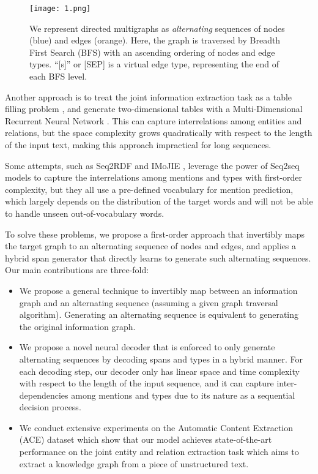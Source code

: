 \documentclass[11pt,a4paper]{article}
\begin{document}
\begin{figure}[t]
\centering
\texttt{[image: 1.png]}
\caption{We represent directed multigraphs  as \emph{alternating} sequences of nodes (blue) and edges (orange). 
Here, the graph is traversed by Breadth First Search (BFS) with an ascending ordering of nodes and edge types. ``[s]'' or [SEP] is a virtual edge type,  representing the end of each BFS level.}\label{f1}
\end{figure}


Another approach is to treat the joint information extraction task as a table filling problem \cite{zhang-etal-2017-end,tse}, and generate two-dimensional tables with a Multi-Dimensional Recurrent Neural Network \cite{graves2007multi}. This  can capture interrelations among entities and relations, but the space complexity grows quadratically with respect to the length of the input text, making this approach impractical for long sequences. 


Some attempts, such as Seq2RDF \cite{liu2018seq2rdf} and IMoJIE \cite{kolluru2020imojie},  leverage the power of Seq2seq models \cite{seq2seq} to capture the interrelations among  mentions and  types with  first-order complexity, but they all use a pre-defined vocabulary for mention prediction, which largely depends on the distribution of the target words and will not be able to handle unseen out-of-vocabulary words. 

To solve these problems, we propose a first-order approach that invertibly maps the target graph to an alternating sequence of nodes and edges, and applies a hybrid span generator that directly learns to generate such alternating sequences. Our main contributions are three-fold:

\begin{itemize}
    \item We propose a general technique to invertibly map between an information graph and an alternating sequence (assuming a given  graph traversal algorithm). Generating an alternating sequence is equivalent to generating the original information graph. 
    \item We propose a novel neural decoder that is enforced to only generate alternating sequences by decoding spans and types in a hybrid manner. For each decoding step, our decoder only has linear space and time complexity with respect to the length of the input sequence, and it can capture inter-dependencies among mentions and types due to its nature as a sequential decision process.
    \item We conduct extensive experiments on the Automatic Content Extraction (ACE) dataset which show that our model achieves state-of-the-art performance on the joint entity and relation extraction task which aims to extract a knowledge graph from a piece of unstructured text. \end{itemize}
\end{document}
